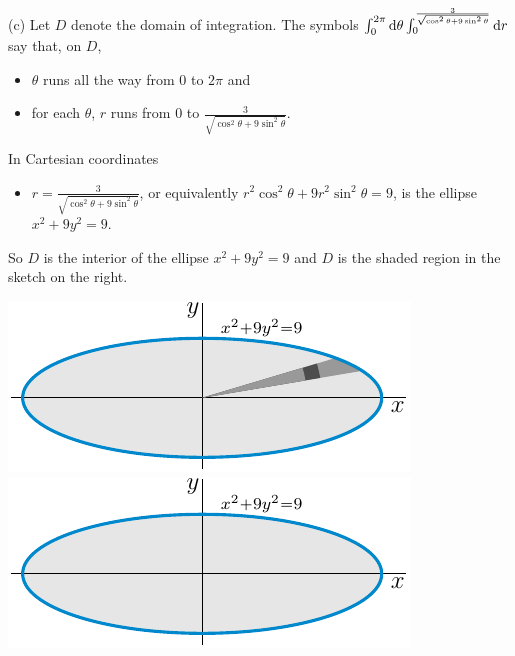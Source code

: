 \begin{solution}
(c)
Let $D$ denote the domain of integration. The symbols
$\int_0^{2\pi}\mathrm{d}\theta
     \int_0^{\frac{3}{\sqrt{\cos^2\theta+9\sin^2\theta}}}\mathrm{d}r$ 
say that, on $D$,
\begin{itemize}
\item 
$\theta$ runs all the way from $0$ to $2\pi$ and
\item 
for each $\theta$,
$r$ runs from $0$ to $\frac{3}{\sqrt{\cos^2\theta+9\sin^2\theta}}$.
\end{itemize}
In Cartesian coordinates
\begin{itemize}
\item 
$r=\frac{3}{\sqrt{\cos^2\theta+9\sin^2\theta}}$, or equivalently
$r^2\cos^2\theta+9r^2\sin^2\theta=9$, is the ellipse $x^2+9y^2=9$.
\end{itemize}
So $D$ is the interior of the ellipse $x^2+9y^2=9$
and $D$ is the shaded region in the sketch on the right.
\begin{center}
     \includegraphics{fig/polar6c1.pdf}\qquad\qquad
     \includegraphics{fig/polar6c2.pdf}
\end{center}

\end{solution}



\subsection*{\Procedural}

